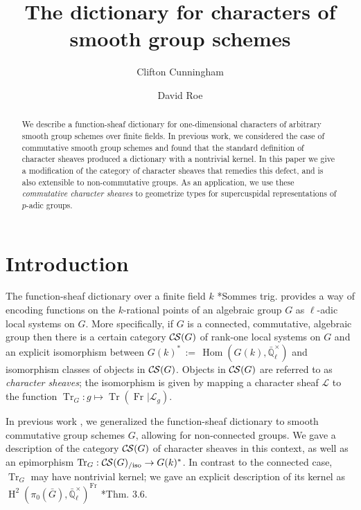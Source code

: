 \documentclass[10pt]{amsart}
\title[Commutative Character Sheaves]{The dictionary for characters of smooth group schemes}
\author{Clifton Cunningham}
\author{David Roe}
\theoremstyle{plain}
\theoremstyle{definition}
\newcommand{\EE}{\mathbb{\bar Q}_\ell}
\newcommand{\EEx}{\EE^\times}
\newcommand{\Frob}[1]{\operatorname{Fr}_{#1}}
\DeclareMathOperator{\Hom}{Hom}
\DeclareMathOperator{\Hh}{H}
\newcommand{\ceq}{{\, :=\, }}
\DeclareMathOperator{\Tr}{Tr}
\newcommand{\TrFrob}[1]{\Tr_{#1}}
\newcommand{\cs}[1]{{\mathcal{#1}}}
\newcommand{\CS}{{\mathcal{C\hskip-0.8pt S}}}
\newcommand{\CSiso}[1]{\CS(#1)_{/\text{iso}}}
\newcommand{\bG}{\bar{G}}
\begin{document}
\begin{abstract}
We describe a function-sheaf dictionary for one-dimensional characters of arbitrary smooth group schemes over finite fields.  
In previous work, we considered the case of commutative smooth group schemes and found that the standard definition of character sheaves produced a dictionary with a nontrivial kernel.  
In this paper we give a modification of the category of character sheaves that remedies this defect, and is also extensible to non-commutative groups.  
As an application, we use these \emph{commutative character sheaves} to geometrize types for supercuspidal representations of $p$-adic groups.
\end{abstract}

\maketitle

\tableofcontents

\section*{Introduction}

The function-sheaf dictionary over a finite field $k$ \cite{deligne:SGA4.5}*{Sommes trig.}
provides a way of encoding functions on the $k$-rational points of an algebraic group $G$
as $\ell$-adic local systems on $G$.  More specifically, if $G$ is a connected, commutative, algebraic group
then there is a certain category $\CS(G)$ of rank-one local systems on $G$ and an
explicit isomorphism between $G(k)^* \ceq \Hom(G(k), \EEx)$ and isomorphism classes
of objects in $\CS(G)$.  Objects in $\CS(G)$ are referred to as \emph{character sheaves};
the isomorphism is given by mapping a character sheaf $\cs{L}$ to the function
$\TrFrob{G} : g \mapsto \Tr(\Frob{} \vert \cs{L}_g)$.

In previous work \cite{cunningham-roe:13a}, we generalized the function-sheaf dictionary to
smooth commutative group schemes $G$, allowing for non-connected groups.
We gave a description of the category $\CS(G)$ of character sheaves in this context, as well
as an epimorphism $\TrFrob{G} : \CSiso{G} \to G(k)^*$.
In contrast to the connected case, $\TrFrob{G}$ may have nontrivial kernel;
we gave an explicit description of its kernel as $\Hh^2(\pi_0(\bG), \EEx)^{\Frob{}}$ \cite{cunningham-roe:13a}*{Thm. 3.6}.  
\end{document}
